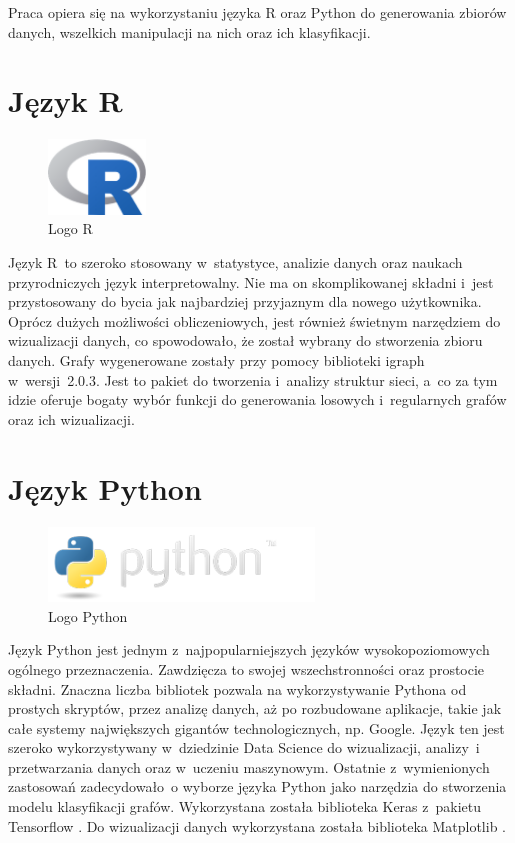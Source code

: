 Praca opiera się na wykorzystaniu języka R \cite{strR} oraz Python \cite{strPython} do generowania zbiorów danych,
wszelkich manipulacji na nich oraz ich klasyfikacji.

\section{Język R}

\begin{figure}[ht]
	\centering
	\includegraphics[height=2cm]{resources/technologies/images/logo_r.png}
	\caption{Logo R \cite{strR}}
	\label{Fig:tech-r}
\end{figure}
\FloatBarrier

Język R~to szeroko stosowany w~statystyce, analizie danych oraz naukach przyrodniczych język interpretowalny.
Nie ma on skomplikowanej składni i~jest przystosowany do bycia jak najbardziej przyjaznym dla nowego użytkownika.
Oprócz dużych możliwości obliczeniowych, jest również świetnym narzędziem do wizualizacji danych,
co spowodowało, że został wybrany do stworzenia zbioru danych.
Grafy wygenerowane zostały przy pomocy biblioteki igraph \cite{strIgraph} w~wersji~2.0.3.
Jest to pakiet do tworzenia i~analizy struktur sieci, a~co za tym idzie oferuje bogaty wybór funkcji do
generowania losowych i~regularnych grafów oraz ich wizualizacji.

\section{Język Python}

\begin{figure}[ht]
	\centering
	\includegraphics[height=2cm]{resources/technologies/images/logo_python.png}
	\caption{Logo Python \cite{strPython}}
	\label{Fig:tech-python}
\end{figure}
\FloatBarrier

Język Python jest jednym z~najpopularniejszych języków wysokopoziomowych ogólnego przeznaczenia.
Zawdzięcza to swojej wszechstronności oraz prostocie składni.
Znaczna liczba bibliotek pozwala na wykorzystywanie Pythona od
prostych skryptów, przez analizę danych, aż po rozbudowane aplikacje, takie jak całe
systemy największych gigantów technologicznych, np. Google. Język ten jest szeroko
wykorzystywany w~dziedzinie Data Science do wizualizacji, analizy~i przetwarzania danych oraz w~uczeniu maszynowym.
Ostatnie z~wymienionych zastosowań zadecydowało~o wyborze języka Python jako narzędzia do stworzenia modelu klasyfikacji grafów.
Wykorzystana została biblioteka Keras z~pakietu Tensorflow \cite{strTensorFlow}.
Do wizualizacji danych wykorzystana została biblioteka Matplotlib \cite{strMatplotlib}.

